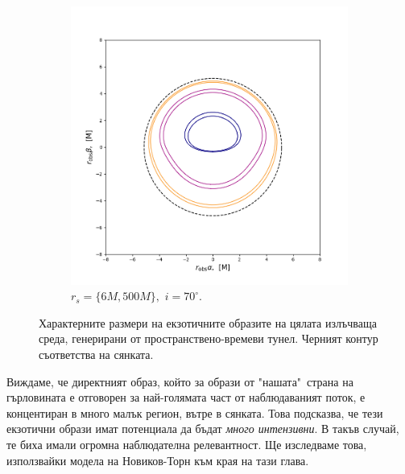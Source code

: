 \begin{figure}[!htb]
\begin{subfigure}{6cm}
		\includegraphics[scale = 0.35]{WH_70_deg_r6_r500.png}
		\caption{$r_s = \{6M, 500M\},\,\, i = 70^\circ$.}
	\end{subfigure}
	\caption[Характерните размери на екзотичните образите на цялата излъчваща среда, генерирани от пространствено-времеви тунел.]{\small Характерните размери на екзотичните образите на цялата излъчваща среда, генерирани от пространствено-времеви тунел. Черният контур съответства на сянката.} 
	\label{WH_img_size_deg}
\end{figure}
Виждаме, че директният образ, който за образи от "нашата"$\,$ страна на гърловината е отговорен за най-голямата част от наблюдаваният поток, е концентиран в много малък регион, вътре в сянката. Това подсказва, че тези екзотични образи имат потенциала да бъдат \emph{много интензивни}. В такъв случай, те биха имали огромна наблюдателна релевантност. Ще изследваме това, използвайки модела на Новиков-Торн към края на тази глава.\\ 

